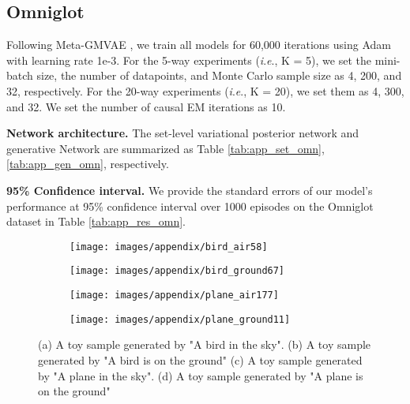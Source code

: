 \documentclass[letterpaper]{article} \usepackage{aaai23}  \usepackage{times}  \usepackage{helvet}  \usepackage{courier}  \usepackage[hyphens]{url}  \usepackage{graphicx} \urlstyle{rm} \def\UrlFont{\rm}  \usepackage{natbib}  \usepackage{caption} \frenchspacing  \setlength{\pdfpagewidth}{8.5in}  \setlength{\pdfpageheight}{11in}  \usepackage{algorithm}
\newcommand{\ie}{\textit{i}.\textit{e}.}
\theoremstyle{plain}
\theoremstyle{definition}
\theoremstyle{remark}
\begin{document}
\subsection{Omniglot}
Following Meta-GMVAE \cite{lee2021metagmvae}, we train all models for 60,000 iterations using Adam \cite{kingma2015adam} with learning rate 1e-3. For the 5-way experiments (\ie, K = 5), we set the mini-batch size, the number of datapoints, and Monte Carlo sample size as 4, 200, and 32, respectively. For the 20-way experiments (\ie, K = 20), we set them as 4, 300, and 32. We set the number of causal EM iterations as 10.




\textbf{Network architecture.} The set-level variational posterior network  and generative Network  are summarized as Table \ref{tab:app_set_omn}, \ref{tab:app_gen_omn}, respectively.

\textbf{95\% Confidence interval.} We provide the standard errors of our model’s performance at 95\% confidence interval over 1000 episodes on the Omniglot dataset in Table \ref{tab:app_res_omn}.



\begin{figure*}
	\centering
	\begin{subfigure}[t]{.22\textwidth}
		\centering
		\texttt{[image: images/appendix/bird\_air58]}
		\caption{}
	\end{subfigure}
	\hfill
	\begin{subfigure}[t]{.22\textwidth}
		\centering
		\texttt{[image: images/appendix/bird\_ground67]}
		\caption{}
		\label{fig:app_toy_21}
	\end{subfigure}		
	\hfill		
	\begin{subfigure}[t]{.22 \textwidth}
		\centering
		\texttt{[image: images/appendix/plane\_air177]}
		\caption{}
		\label{fig:app_toy_31}
	\end{subfigure}
	\hfill
	\begin{subfigure}[t]{.22\textwidth}
		\centering
		\texttt{[image: images/appendix/plane\_ground11]}
		\caption{}
		\label{fig:app_toy_41}
	\end{subfigure}
	
	\caption{(a) A toy sample generated by "A bird in the sky". (b) A toy sample generated by "A bird is on the ground" (c) A toy sample generated by "A plane in the sky". (d) A toy sample generated by "A plane is on the ground" }  
	\label{fig:app_toy_12}
\end{figure*}
\end{document}
